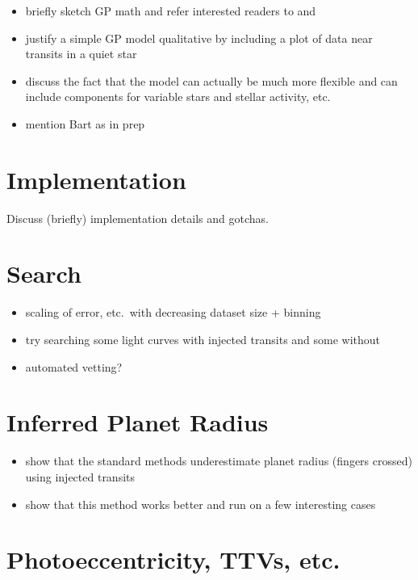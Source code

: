 \documentclass[preprint,12pt]{aastex}
\begin{document}
\begin{itemize}

\item{briefly sketch GP math and refer interested readers to
\citet{bishop-book} and \citet{gibson-gp}}
\item{justify a simple GP model qualitative by including a plot of data near
transits in a quiet star}
\item{discuss the fact that the model can actually be much more flexible and
can include components for variable stars and stellar activity, etc.}
\item{mention Bart as in prep}

\end{itemize}

\section{Implementation}

Discuss (briefly) implementation details and gotchas.

\section{Search}

\begin{itemize}

\item{scaling of error, etc.\ with decreasing dataset size + binning}
\item{try searching some light curves with injected transits and some without}
\item{automated vetting?}

\end{itemize}

\section{Inferred Planet Radius}

\begin{itemize}

\item{show that the standard methods underestimate planet radius (fingers
crossed) using injected transits}
\item{show that this method works better and run on a few interesting cases}

\end{itemize}

\section{Photoeccentricity, TTVs, etc.}
\end{document}
